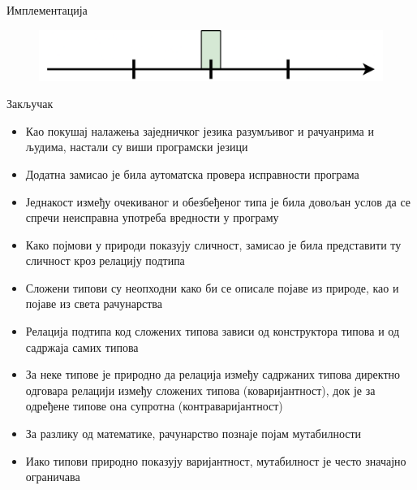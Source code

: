 \documentclass[xcolor=table]{beamer}
\begin{document}
\begin{frame}[allowframebreaks]{Имплементација}
        \framebreak
        
        \begin{figure}
            \centering
            \includegraphics[width=\textwidth,height=0.8\textheight,keepaspectratio]{images/uni_int43.png}
        \end{figure}
    \end{frame}
    
    \begin{frame}[allowframebreaks]{Закључак}
        \begin{itemize}
            \item Као покушај налажења заједничког језика разумљивог и рачуанрима и људима, настали су виши програмски језици
            \item Додатна замисао је била аутоматска провера исправности програма
            \item Једнакост између очекиваног и обезбеђеног типа је била довољан услов да се спречи неисправна употреба вредности у програму
            \item Како појмови у природи показују сличност, замисао је била представити ту сличност кроз релацију подтипа
        \end{itemize}
        
        \framebreak
        
        \begin{itemize}
            \item Сложени типови су неопходни како би се описале појаве из природе, као и појаве из света рачунарства
            \item Релација подтипа код сложених типова зависи од конструктора типова и од садржаја самих типова
            \item За неке типове је природно да релација између садржаних типова директно одговара релацији између сложених типова (коваријантност), док је за одређене типове она супротна (контраваријантност)
            \item За разлику од математике, рачунарство познаје појам мутабилности
            \item Иако типови природно показују варијантност, мутабилност је често значајно ограничава
        \end{itemize}
        

\end{frame}
\end{document}
